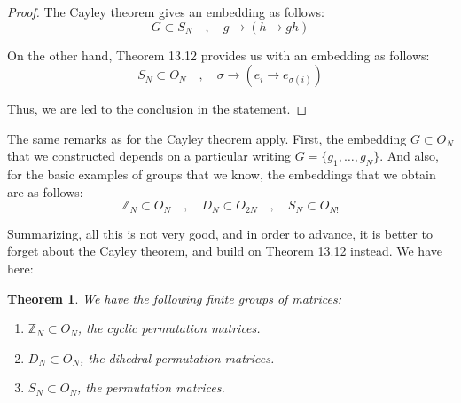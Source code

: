 \documentclass[12pt]{amsbook}
\newtheorem{theorem}{Theorem}[chapter]
\begin{document}
\begin{proof}
The Cayley theorem gives an embedding as follows:
$$G\subset S_N\quad,\quad g\to(h\to gh)$$

On the other hand, Theorem 13.12 provides us with an embedding as follows:
$$S_N\subset O_N\quad,\quad 
\sigma\to(e_i\to e_{\sigma(i)})$$

Thus, we are led to the conclusion in the statement.
\end{proof}

The same remarks as for the Cayley theorem apply. First, the embedding $G\subset O_N$ that we constructed depends on a particular writing $G=\{g_1,\ldots,g_N\}$. And also, for the basic examples of groups that we know, the embeddings that we obtain are as follows:
$$\mathbb Z_N\subset O_N\quad,\quad 
D_N\subset O_{2N}\quad,\quad 
S_N\subset O_{N!}$$

Summarizing, all this is not very good, and in order to advance, it is better to forget about the Cayley theorem, and build on Theorem 13.12 instead. We have here:

\begin{theorem}
We have the following finite groups of matrices:
\begin{enumerate}
\item $\mathbb Z_N\subset O_N$, the cyclic permutation matrices.

\item $D_N\subset O_N$, the dihedral permutation matrices.

\item $S_N\subset O_N$, the permutation matrices.
\end{enumerate}
\end{theorem}
\end{document}

